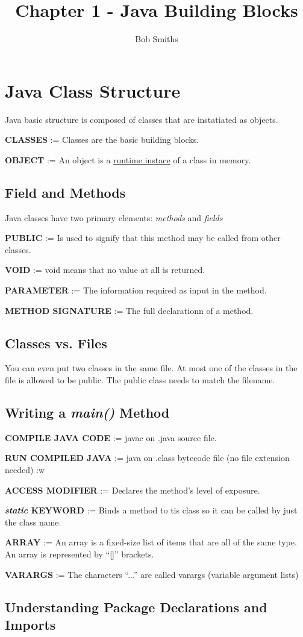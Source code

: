\documentclass{article}
\author{Bob Smiths}
\title{Chapter 1 - Java Building Blocks}
\begin{document}
\maketitle

\section{Java Class Structure}
Java basic structure is composed of classes that are instatiated as objects.

\textbf{CLASSES} := Classes are the basic building blocks.

\textbf{OBJECT} := An object is a \underline{runtime instace} of a class in memory.

\subsection{Field and Methods}
Java classes have two primary elements: \textit{methods} and \textit{fields}

\textbf{PUBLIC} := Is used to signify that this method may be called from other classes.

\textbf{VOID} := void means that no value at all is returned.

\textbf{PARAMETER} := The information required as input in the method.

\textbf{METHOD SIGNATURE} := The full declarationn of a method.

\subsection{Classes vs. Files}
You can even put two classes in the same file. At most one of the classes in the file is allowed to be public.
The public class needs to match the filename.

\subsection{Writing a \textit{main()} Method}
\textbf{COMPILE JAVA CODE} := javac on .java source file.

\textbf{RUN COMPILED JAVA} := java on .class bytecode file (no file extension needed)
:w

\textbf{ACCESS MODIFIER} := Declares the method's level of exposure.

\textbf{\textit{static} KEYWORD} := Binds a method to tis class so it can be called by just the class name.

\textbf{ARRAY} := An array is a fixed-size list of items that are all of the same type. An array is represented by ``[]'' brackets.

\textbf{VARARGS} := The characters ``...'' are called varargs (variable argument lists)

\subsection{Understanding Package Declarations and Imports}
\end{document}
